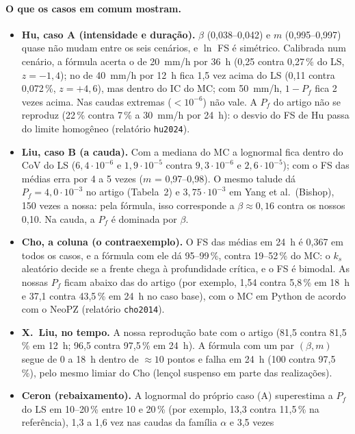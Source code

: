 \documentclass[11pt,a4paper]{article}
\newcommand{\Pf}{P_f}
\begin{document}
\paragraph{O que os casos em comum mostram.}
\begin{itemize}
  \item \textbf{Hu, caso A (intensidade e duração).} $\beta$ (0,038--0,042) e $m$ (0,995--0,997) quase não mudam entre os
    seis cenários, e $\ln$ FS é simétrico. Calibrada num cenário, a fórmula acerta o de 20~mm/h por 36~h (0,25 contra
    0,27\,\% do LS, $z = -1{,}4$); no de 40~mm/h por 12~h fica 1,5 vez acima do LS (0,11 contra 0,072\,\%, $z = +4{,}6$),
    mas dentro do IC do MC; com 50~mm/h, $1 - \Pf$ fica 2 vezes acima. Nas caudas extremas ($< 10^{-6}$) não vale. A
    $\Pf$ do artigo não se reproduz (22\,\% contra 7\,\% a 30~mm/h por 24~h): o desvio do FS de Hu passa do limite
    homogêneo (relatório \texttt{hu2024}).
  \item \textbf{Liu, caso B (a cauda).} Com a mediana do MC a lognormal fica dentro do CoV do LS ($6{,}4 \cdot 10^{-6}$
    e $1{,}9 \cdot 10^{-5}$ contra $9{,}3 \cdot 10^{-6}$ e $2{,}6 \cdot 10^{-5}$); com o FS das médias erra por 4 a 5
    vezes ($m$ = 0,97--0,98). O mesmo talude dá $\Pf = 4{,}0 \cdot 10^{-3}$ no artigo (Tabela~2) e $3{,}75 \cdot
    10^{-3}$ em Yang et al.\ (Bishop), 150 vezes a nossa: pela fórmula, isso corresponde a $\beta \approx 0{,}16$ contra
    os nossos 0,10. Na cauda, a $\Pf$ é dominada por $\beta$.
  \item \textbf{Cho, a coluna (o contraexemplo).} O FS das médias em 24~h é 0,367 em todos os casos, e a fórmula com ele
    dá 95--99\,\%, contra 19--52\,\% do MC: o $k_s$ aleatório decide se a frente chega à profundidade crítica, e o FS é
    bimodal. As nossas $\Pf$ ficam abaixo das do artigo (por exemplo, 1,54 contra 5,8\,\% em 18~h e 37,1 contra 43,5\,\%
    em 24~h no caso base), com o MC em Python de acordo com o NeoPZ (relatório \texttt{cho2014}).
  \item \textbf{X.\ Liu, no tempo.} A nossa reprodução bate com o artigo (81,5 contra 81,5\,\% em 12~h; 96,5 contra
    97,5\,\% em 24~h). A fórmula com um par $(\beta, m)$ segue de 0 a 18~h dentro de $\approx 10$ pontos e falha em 24~h
    (100 contra 97,5\,\%), pelo mesmo limiar do Cho (lençol suspenso em parte das realizações).
  \item \textbf{Ceron (rebaixamento).} A lognormal do próprio caso (A) superestima a $\Pf$ do LS em 10--20\,\% entre 10 e
    20\,\% (por exemplo, 13,3 contra 11,5\,\% na referência), 1,3 a 1,6 vez nas caudas da família $\alpha$ e 3,5 vezes

\end{itemize}
\end{document}
